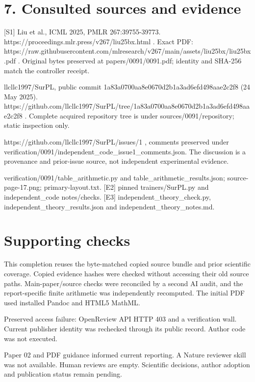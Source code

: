 \documentclass[10pt]{article}
\begin{document}
\section*{7. Consulted sources and evidence}
[S1] Liu et al., ICML 2025, PMLR 267:39755-39773. https://proceedings.mlr.press/v267/liu25bx.html . Exact PDF: https://raw.githubusercontent.com/mlresearch/v267/main/assets/liu25bx/liu25bx.pdf . Original bytes preserved at papers/0091/0091.pdf; identity and SHA-256 match the controller receipt.\par
[S2] llcllc1997/SurPL, public commit 1a83a0700aa8e0670d2b1a3ad6efd498aae2c2f8 (24 May 2025). https://github.com/llcllc1997/SurPL/tree/1a83a0700aa8e0670d2b1a3ad6efd498aae2c2f8 . Complete acquired repository tree is under sources/0091/repository; static inspection only.\par
[S3] https://github.com/llcllc1997/SurPL/issues/1 , comments preserved under verification/0091/independent\_code\_issue1\_comments.json. The discussion is a provenance and prior-issue source, not independent experimental evidence.\par
[E1] verification/0091/table\_arithmetic.py and table\_arithmetic\_results.json; source-page-17.png; primary-layout.txt. [E2] pinned trainers/SurPL.py and independent\_code notes/checks. [E3] independent\_theory\_check.py, independent\_theory\_results.json and independent\_theory\_notes.md.\par
\section*{Supporting checks}
This completion reuses the byte-matched copied source bundle and prior scientific coverage. Copied evidence hashes were checked without accessing their old source paths. Main-paper/source checks were reconciled by a second AI audit, and the report-specific finite arithmetic was independently recomputed. The initial PDF used installed Pandoc and HTML5 MathML.\par
Preserved access failure: OpenReview API HTTP 403 and a verification wall. Current publisher identity was rechecked through its public record. Author code was not executed.\par
Paper 02 and PDF guidance informed current reporting. A Nature reviewer skill was not available. Human reviews are empty. Scientific decisions, author adoption and publication status remain pending.\par
\end{document}
